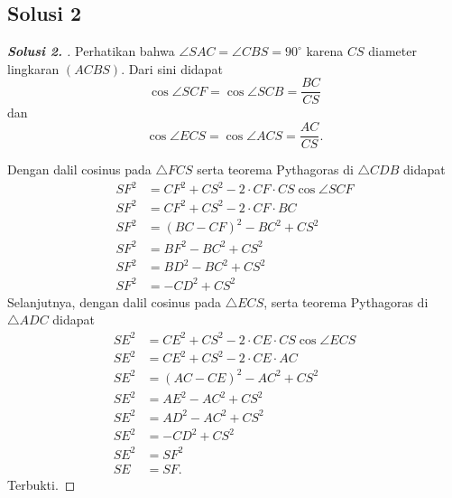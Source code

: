 \documentclass[11pt]{scrartcl}
\begin{document}
\subsection{Solusi 2}
\begin{proof}[\textbf{Solusi 2. }] 
Perhatikan bahwa $\angle SAC = \angle CBS = 90^\circ$ karena $CS$ diameter lingkaran $(ACBS)$. Dari sini didapat 
$$\cos \angle SCF = \cos \angle SCB = \frac{BC}{CS}$$ 
dan 
$$\cos \angle ECS = \cos \angle ACS = \frac{AC}{CS}.$$

Dengan dalil cosinus pada $\triangle FCS$ serta teorema Pythagoras di $\triangle CDB$ didapat
\begin{align*}
    SF^2 &= CF^2 + CS^2 - 2\cdot CF \cdot CS \cos \angle SCF\\
    SF^2 &= CF^2 + CS^2 - 2\cdot CF \cdot BC\\
    SF^2 &= (BC-CF)^2 - BC^2 + CS^2\\
    SF^2 &= BF^2 - BC^2 + CS^2\\
    SF^2 &= BD^2 - BC^2 + CS^2\\
    SF^2 &= -CD^2 + CS^2
\end{align*}
Selanjutnya, dengan dalil cosinus pada $\triangle ECS$, serta teorema Pythagoras di $\triangle ADC$ didapat
\begin{align*}
    SE^2 &= CE^2 + CS^2 - 2\cdot CE \cdot CS \cos \angle ECS \\
    SE^2 &= CE^2 + CS^2 - 2\cdot CE \cdot AC\\
    SE^2 &= (AC-CE)^2 - AC^2 + CS^2\\
    SE^2 &= AE^2 - AC^2 + CS^2\\
    SE^2 &= AD^2 - AC^2 + CS^2\\
    SE^2 &= -CD^2 + CS^2\\
    SE^2 &= SF^2\\
    SE &= SF.
\end{align*}
Terbukti.
\end{proof}
\end{document}
